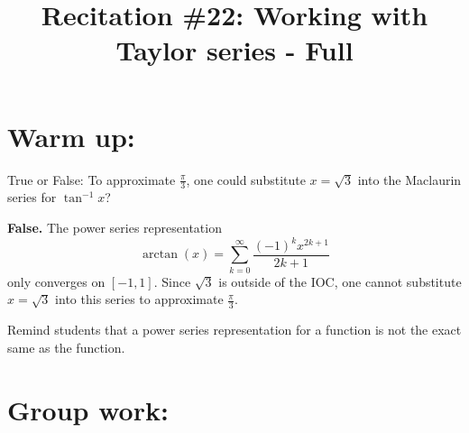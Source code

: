 \documentclass[]{ximera}
\title{Recitation \#22: Working with Taylor series - Full}
\begin{document}
\begin{abstract}		\end{abstract}
\maketitle



\section{Warm up:}
True or False:  To approximate $\frac{\pi}{3}$, one could substitute $x = \sqrt{3}$ into the Maclaurin series for $\tan^{-1}x$?
	\begin{freeResponse}
	{\bf False.}  The power series representation 
		\[
		\arctan(x) = \sum_{k=0}^\infty \frac{(-1)^k x^{2k+1}}{2k+1}
		\]
	only converges on $[-1,1]$.  
	Since $\sqrt{3}$ is outside of the IOC, one cannot substitute $x=\sqrt{3}$ into this series to approximate $\frac{\pi}{3}$.  
	\end{freeResponse}	
\begin{instructorNotes}
Remind students that a power series representation for a function is not the exact same as the function.
\end{instructorNotes}







\section{Group work:}
\end{document}
